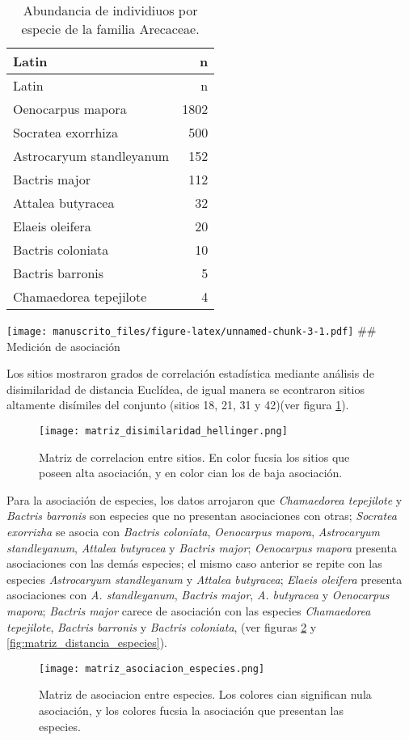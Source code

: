 \documentclass[11pt,]{article}
\begin{document}
\begin{longtable}[]{@{}lr@{}}
\caption{\label{tab:abun_sp}Abundancia de individiuos por especie de la
familia Arecaceae.}\tabularnewline
\toprule
Latin & n\tabularnewline
\midrule
\endfirsthead
\toprule
Latin & n\tabularnewline
\midrule
\endhead
Oenocarpus mapora & 1802\tabularnewline
Socratea exorrhiza & 500\tabularnewline
Astrocaryum standleyanum & 152\tabularnewline
Bactris major & 112\tabularnewline
Attalea butyracea & 32\tabularnewline
Elaeis oleifera & 20\tabularnewline
Bactris coloniata & 10\tabularnewline
Bactris barronis & 5\tabularnewline
Chamaedorea tepejilote & 4\tabularnewline
\bottomrule
\end{longtable}

\texttt{[image: manuscrito\_files/figure-latex/unnamed-chunk-3-1.pdf]}
\#\# Medición de asociación

Los sitios mostraron grados de correlación estadística mediante análisis
de disimilaridad de distancia Euclídea, de igual manera se econtraron
sitios altamente disímiles del conjunto (sitios 18, 21, 31 y 42)(ver
figura \ref{fig:matriz_disimilaridad_hellinger}).

\begin{figure}
\centering
\texttt{[image: matriz\_disimilaridad\_hellinger.png]}
\caption{Matriz de correlacion entre sitios. En color fucsia los sitios
que poseen alta asociación, y en color cian los de baja asociación.
\label{fig:matriz_disimilaridad_hellinger}}
\end{figure}

Para la asociación de especies, los datos arrojaron que
\emph{Chamaedorea tepejilote} y \emph{Bactris barronis} son especies que
no presentan asociaciones con otras; \emph{Socratea exorrizha} se asocia
con \emph{Bactris coloniata}, \emph{Oenocarpus mapora},
\emph{Astrocaryum standleyanum}, \emph{Attalea butyracea} y
\emph{Bactris major}; \emph{Oenocarpus mapora} presenta asociaciones con
las demás especies; el mismo caso anterior se repite con las especies
\emph{Astrocaryum standleyanum} y \emph{Attalea butyracea}; \emph{Elaeis
oleifera} presenta asociaciones con \emph{A. standleyanum},
\emph{Bactris major}, \emph{A. butyracea} y \emph{Oenocarpus mapora};
\emph{Bactris major} carece de asociación con las especies
\emph{Chamaedorea tepejilote}, \emph{Bactris barronis} y \emph{Bactris
coloniata}, (ver figuras \ref{fig:matriz_asociacion_especies} y
\ref{fig:matriz_distancia_especies}).

\begin{figure}
\centering
\texttt{[image: matriz\_asociacion\_especies.png]}
\caption{Matriz de asociacion entre especies. Los colores cian
significan nula asociación, y los colores fucsia la asociación que
presentan las especies. \label{fig:matriz_asociacion_especies}}
\end{figure}
\end{document}
